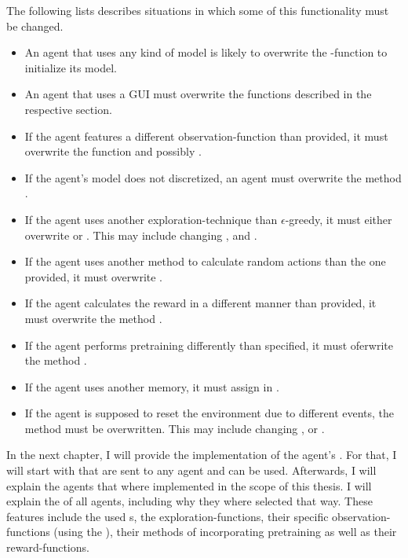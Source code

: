 The following lists describes situations in which some of this functionality must be changed.
\begin{itemize}
	\item An agent that uses any kind of model is likely to overwrite the -function to initialize its model. 
	\item An agent that uses a GUI must overwrite the functions described in the respective section. 
	\item If the agent features a different observation-function than provided, it must overwrite the function  and possibly . 
	\item If the agent's model does not discretized, an agent must overwrite the method .
	\item If the agent uses another exploration-technique than $\epsilon$-greedy, it must either overwrite  or . This may include changing ,  and .
	\item If the agent uses another method to calculate random actions than the one provided, it must overwrite .
	\item If the agent calculates the reward in a different manner than provided, it must overwrite the method .
	\item If the agent performs pretraining differently than specified, it must oferwrite the method .
	\item If the agent uses another memory, it must assign  in .
	\item If the agent is supposed to reset the environment due to different events, the method  must be overwritten. This may include changing ,  or .
\end{itemize}

In the next chapter, I will provide the implementation of the agent's . For that, I will start with  that are sent to any agent and can be used. Afterwards, I will explain the agents that where implemented in the scope of this thesis. I will explain the  of all agents, including why they where selected that way. These features include the used s, the exploration-functions, their specific observation-functions (using the ), their methods of incorporating pretraining as well as their reward-functions. 

